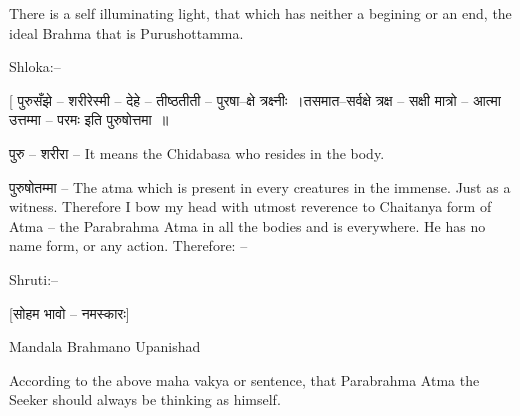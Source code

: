 There is a self illuminating light, that which has neither a begining or an end, the ideal Brahma that is Purushottamma.

Shloka:–

 [ पुरुसँझे – शरीरेस्मी – देहे – तीष्ठतीती – पुरषा–क्षे त्रक्ष्नीः~।तसमात–सर्वक्षे त्रक्ष – सक्षी मात्रो – आत्मा उत्तम्मा – परमः इति पुरुषोत्तमा~॥

पुरु – शरीरा – It means the Chidabasa who resides in the body.

पुरुषोतम्मा – The atma which is present in every creatures in the immense. Just as a witness. Therefore I bow my head with utmost reverence to Chaitanya form of Atma – the Parabrahma Atma in all the bodies and is everywhere. He has no name form, or any action. Therefore: –

Shruti:–

[सोहम भावो – नमस्कारः]

Mandala Brahmano Upanishad

According to the above maha vakya or sentence, that Parabrahma Atma the Seeker should always be thinking as himself.


